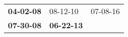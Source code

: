 \begin{supertabular}{p{0.33\columnwidth}p{0.33\columnwidth}p{0.33\columnwidth}}
 \textbf{04-02-08\textsuperscript{}} &           08-12-10\textsuperscript{} &  07-08-16\textsuperscript{} \\
 \textbf{07-30-08\textsuperscript{}} &  \textbf{06-22-13\textsuperscript{}} &                             \\
\end{supertabular}
